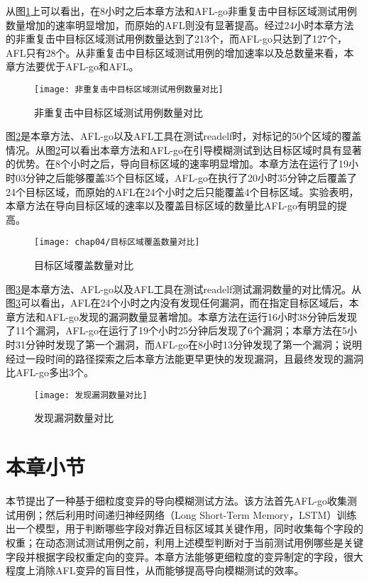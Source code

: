 从图\ref{非重复击中目标区域测试用例数量对比}上可以看出，在8小时之后本章方法和AFL-go非重复击中目标区域测试用例数量增加的速率明显增加，而原始的AFL则没有显著提高。经过24小时本章方法的非重复击中目标区域测试用例数量达到了213个，而AFL-go只达到了127个，AFL只有28个。从非重复击中目标区域测试用例的增加速率以及总数量来看，本章方法要优于AFL-go和AFL。

\begin{figure}[htb]
\begin{center}
\texttt{[image: 非重复击中目标区域测试用例数量对比]}
\end{center}
\caption{非重复击中目标区域测试用例数量对比}
\label{非重复击中目标区域测试用例数量对比}
\end{figure}

图\ref{目标区域覆盖数量对比}是本章方法、AFL-go以及AFL工具在测试readelf时，对标记的50个区域的覆盖情况。从图\ref{目标区域覆盖数量对比}可以看出本章方法和AFL-go在引导模糊测试到达目标区域时具有显著的优势。在8个小时之后，导向目标区域的速率明显增加。本章方法在运行了19小时03分钟之后能够覆盖35个目标区域，AFL-go在执行了20小时35分钟之后覆盖了24个目标区域，而原始的AFL在24个小时之后只能覆盖4个目标区域。实验表明，本章方法在导向目标区域的速率以及覆盖目标区域的数量比AFL-go有明显的提高。

\begin{figure}[htb]
\begin{center}
\texttt{[image: chap04/目标区域覆盖数量对比]}
\end{center}
\caption{目标区域覆盖数量对比}
\label{目标区域覆盖数量对比}
\end{figure}

图\ref{发现漏洞数量对比}是本章方法、AFL-go以及AFL工具在测试readelf测试漏洞数量的对比情况。从图\ref{发现漏洞数量对比}可以看出，AFL在24个小时之内没有发现任何漏洞，而在指定目标区域后，本章方法和AFL-go发现的漏洞数量显著增加。本章方法在运行16小时38分钟后发现了11个漏洞，AFL-go在运行了19个小时25分钟后发现了6个漏洞；本章方法在5小时31分钟时发现了第一个漏洞，而AFL-go在8小时13分钟发现了第一个漏洞；说明经过一段时间的路径探索之后本章方法能更早更快的发现漏洞，且最终发现的漏洞比AFL-go多出3个。
\begin{figure}[htb]
\begin{center}
\texttt{[image: 发现漏洞数量对比]}
\end{center}
\caption{发现漏洞数量对比}
\label{发现漏洞数量对比}
\end{figure}

\section{本章小节}

本节提出了一种基于细粒度变异的导向模糊测试方法。该方法首先AFL-go收集测试用例；然后利用时间递归神经网络（Long Short-Term Memory，LSTM）训练出一个模型，用于判断哪些字段对靠近目标区域其关键作用，同时收集每个字段的权重；在动态测试测试用例之前，利用上述模型判断对于当前测试用例哪些是关键字段并根据字段权重定向的变异。本章方法能够更细粒度的变异制定的字段，很大程度上消除AFL变异的盲目性，从而能够提高导向模糊测试的效率。

\afterpage{\blankpage}